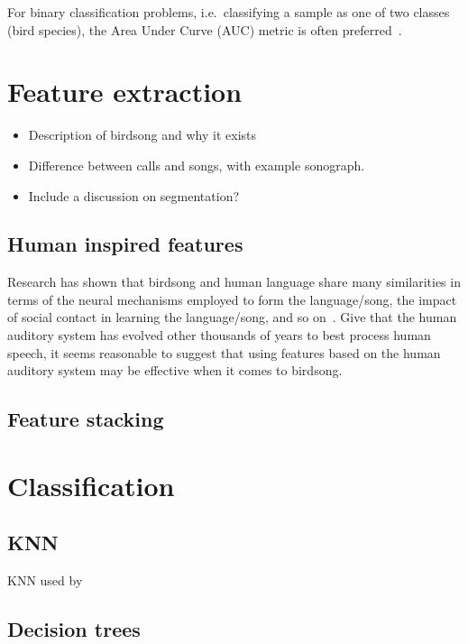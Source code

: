 For binary classification problems, i.e.\ classifying a sample as one of two
classes (bird species), the Area Under Curve (AUC) metric is often
preferred~\cite{leng2014multi}.

\section{Feature extraction}

\begin{itemize}

  \item Description of birdsong and why it exists

  \item Difference between calls and songs, with example sonograph.

  \item Include a discussion on segmentation?

\end{itemize}

\subsection{Human inspired features}

Research has shown that birdsong and human language share many similarities in
terms of the neural mechanisms employed to form the language/song, the impact of
social contact in learning the language/song, and so on~\cite{birdsongspeech}.
Give that the human auditory system has evolved other thousands of years to best
process human speech, it seems reasonable to suggest that using features based
on the human auditory system may be effective when it comes to birdsong.

\subsection{Feature stacking}

\section{Classification}

\subsection{KNN}

KNN used by~\cite{ramashini2019bird}

\subsection{Decision trees}

